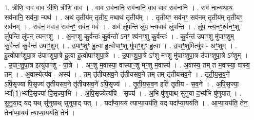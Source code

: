 \documentclass[17pt]{extarticle}
\begin{document}
1. त्रीणि॒ वाव वाव त्रीणि॒ त्रीणि॒ वाव । . वाव सव॑नानि॒ सव॑नानि॒ वाव वाव सव॑नानि । . सव॑ ना॒न्यथाथ॒ सव॑नानि॒ सव॑ना॒ न्यथ॑ । . अथ॑ तृ॒तीय॑म् तृ॒तीय॒ मथाथ॑ तृ॒तीय᳚म् । . तृ॒तीयꣳ॒॒ सव॑नꣳ॒॒ सव॑नम् तृ॒तीय॑म् तृ॒तीयꣳ॒॒ सव॑नम् । . सव॑न॒ मवाव॒ सव॑नꣳ॒॒ सव॑न॒ मव॑ । . अव॑ लुंपन्ति लुंप॒ न्त्यवाव॑ लुंपन्ति । . लुं॒प॒ न्त्य॒नꣳ॒॒श्व॑नꣳ॒॒शु लुं॑पन्ति लुंपन् त्यनꣳ॒॒शु । . अ॒नꣳ॒॒शु कु॒र्वन्तः॑ कु॒र्वन्तो॑ ऽनꣳ॒॒ श्व॑नꣳ॒॒शु कु॒र्वन्तः॑ । . कु॒र्वन्त॑ उपाꣳ॒॒शु मु॑पाꣳ॒॒शुम् कु॒र्वन्तः॑ कु॒र्वन्त॑ उपाꣳ॒॒शुम् । . उ॒पाꣳ॒॒शुꣳ हु॒त्वा हु॒त्वोपाꣳ॒॒शु मु॑पाꣳ॒॒शुꣳ हु॒त्वा । . उ॒पाꣳ॒॒शुमित्यु॑प - अꣳ॒॒शुम् । . हु॒त्वोपाꣳ॑शुपा॒त्र उ॑पाꣳशुपा॒त्रे हु॒त्वा हु॒त्वोपाꣳ॑शुपा॒त्रे । . उ॒पाꣳ॒॒शु॒पा॒त्रे ऽꣳ॑शु मꣳ॒॒शु मु॑पाꣳशुपा॒त्र उ॑पाꣳशुपा॒त्रे ऽꣳ॑शुम् । . उ॒पाꣳ॒॒शु॒पा॒त्र इत्यु॑पाꣳशु - पा॒त्रे । . अꣳ॒॒शु म॒वास्या॒ वास्याꣳ॒॒शु मꣳ॒॒शु म॒वास्य॑ । . अ॒वास्य॒ तम् त म॒वास्या॒ वास्य॒ तम् । . अ॒वास्येत्य॑व - अस्य॑ । . तम् तृ॑तीयसव॒ने तृ॑तीयसव॒ने तम् तम् तृ॑तीयसव॒ने । . तृ॒ती॒य॒स॒व॒ने॑ ऽपि॒सृज्या॑ पि॒सृज्य॑ तृतीयसव॒ने तृ॑तीयसव॒ने॑ ऽपि॒सृज्य॑ । . तृ॒ती॒य॒स॒व॒न इति॑ तृतीय - स॒व॒ने । . अ॒पि॒सृज्या॒ भ्या᳚(1॒)भ्य॑पि॒सृज्या॑ पि॒सृज्या॒भि । . अ॒पि॒सृज्येत्य॑पि - सृज्य॑ । . अ॒भि षु॑णुयाथ् सुनुया द॒भ्य॑भि षु॑णुयात् । . सु॒नु॒या॒द् यद् यथ् सु॑नुयाथ् सुनुया॒द् यत् । . यदा᳚प्या॒यय॑ त्याप्या॒यय॑ति॒ यद् यदा᳚प्या॒यय॑ति । . आ॒प्या॒यय॑ति॒ तेन॒ तेना᳚प्या॒यय॑ त्याप्या॒यय॑ति॒ तेन॑ । \newline
\end{document}
